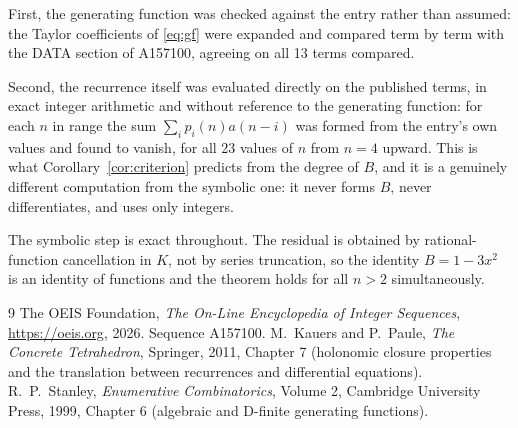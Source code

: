 \documentclass[11pt,a4paper]{article}
\theoremstyle{plain}
\theoremstyle{definition}
\begin{document}
First, the generating function was checked against the entry rather than assumed: the
Taylor coefficients of \eqref{eq:gf} were expanded and compared term by term with the DATA
section of A157100, agreeing on all 13 terms compared.

Second, the recurrence itself was evaluated directly on the published terms, in exact
integer arithmetic and without reference to the generating function: for each $n$ in range
the sum $\sum_{i}p_{i}(n)a(n-i)$ was formed from the entry's own values and found to
vanish, for all 23 values of $n$ from $n=4$ upward. This is what
Corollary~\ref{cor:criterion} predicts from the degree of $B$, and it is a genuinely
different computation from the symbolic one: it never forms $B$, never differentiates, and
uses only integers.

The symbolic step is exact throughout. The residual is obtained by rational-function
cancellation in $K$, not by series truncation, so the identity $B=1 - 3 x^{2}$ is an
identity of functions and the theorem holds for all $n>2$ simultaneously.

\begin{thebibliography}{9}
 The OEIS Foundation, \emph{The On-Line Encyclopedia of Integer Sequences},
\url{https://oeis.org}, 2026. Sequence A157100.
 M.~Kauers and P.~Paule, \emph{The Concrete Tetrahedron}, Springer, 2011,
Chapter 7 (holonomic closure properties and the translation between recurrences and
differential equations).
 R.~P.~Stanley, \emph{Enumerative Combinatorics}, Volume 2, Cambridge
University Press, 1999, Chapter 6 (algebraic and D-finite generating functions).
\end{thebibliography}
\end{document}
